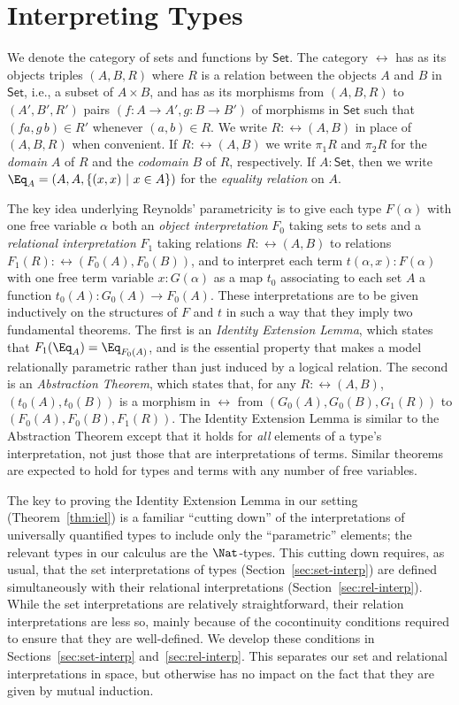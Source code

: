 \documentclass{lmcs}
\theoremstyle{plain}\newtheorem{satz}[thm]{Satz}
\newcommand{\set}{\mathsf{Set}}
\begin{document}
\section{Interpreting Types}\label{sec:type-interp}

We denote the category of sets and functions by $\set$. The category
$\rel$ has as its objects triples $(A,B,R)$ where $R$ is a relation
between the objects $A$ and $B$ in $\set$, i.e., a subset of $A \times
B$, and has as its morphisms from $(A,B,R)$ to $(A',B',R')$ pairs $(f
: A \to A',g : B \to B')$ of morphisms in $\set$ such that $(f a,g\,b)
\in R'$ whenever $(a,b) \in R$. We write $R : \rel(A,B)$ in place of
$(A,B,R)$ when convenient.  If $R : \rel(A,B)$ we write $\pi_1 R$ and
$\pi_2 R$ for the {\em domain} $A$ of $R$ and the {\em codomain} $B$
of $R$, respectively.  If $A : \set$, then we write $\Eq_A =
(A,A,\{(x,x)~|~ x \in A\})$ for the {\em equality relation} on $A$.

The key idea underlying Reynolds' parametricity is to give each type
$F(\alpha)$ with one free variable $\alpha$ both an {\em object
  interpretation} $F_0$ taking sets to sets and a \emph{relational
  interpretation} $F_1$ taking relations $R : \rel(A,B)$ to relations
$F_1 (R) : \rel(F_0 (A), F_0 (B))$, and to interpret each term
$t(\alpha,x) : F(\alpha)$ with one free term variable $x : G(\alpha)$
as a map $t_0$ associating to each set $A$ a function $t_0(A) : G_0(A)
\to F_0(A)$. These interpretations are to be given inductively on the
structures of $F$ and $t$ in such a way that they imply two
fundamental theorems. The first is an \emph{Identity Extension Lemma},
which states that $F_1(\Eq_A) = \Eq_{F_0(A)}$, and is the essential
property that makes a model relationally parametric rather than just
induced by a logical relation. The second is an \emph{Abstraction
  Theorem}, which states that, for any $R :\rel(A, B)$,
$(t_0(A),t_0(B))$ is a morphism in $\rel$ from
$(G_0(A),G_0(B),G_1(R))$ to $(F_0(A),F_0(B),F_1(R))$. The Identity
Extension Lemma is similar to the Abstraction Theorem except that it
holds for {\em all} elements of a type's interpretation, not just
those that are interpretations of terms. Similar theorems are
expected to hold for types and terms with any number of free
variables.

The key to proving the Identity Extension Lemma in our setting
(Theorem~\ref{thm:iel}) is a familiar ``cutting down'' of the
interpretations of universally quantified types to include only the
``parametric'' elements; the relevant types in our calculus are the
$\Nat$-types.  This cutting down requires, as usual, that the set
interpretations of types (Section~\ref{sec:set-interp}) are defined
simultaneously with their relational interpretations
(Section~\ref{sec:rel-interp}). While the set interpretations are
relatively straightforward, their relation interpretations are less
so, mainly because of the cocontinuity conditions required to ensure
that they are well-defined. We develop these conditions in
Sections~\ref{sec:set-interp} and~\ref{sec:rel-interp}. This separates
our set and relational interpretations in space, but otherwise has no
impact on the fact that they are given by mutual induction.
\end{document}

